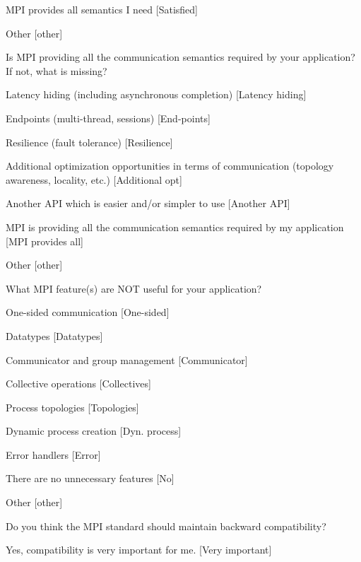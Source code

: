 \documentclass[conference,10pt,letterpaper]{IEEEtran}
\begin{document}
{{\begin{description}
\begin{inparaenum}[{\bf C}1)]
    \item MPI provides all semantics I need [Satisfied]
    \item Other [other]
    \end{inparaenum}
  \item[Q26*:] Is MPI providing all the communication semantics required
    by your application? If not, what is missing? 
    \begin{inparaenum}[{\bf C}1)]
    \item Latency hiding (including asynchronous completion) [Latency hiding]
    \item Endpoints (multi-thread, sessions) [End-points]
    \item Resilience (fault tolerance) [Resilience]
    \item Additional optimization opportunities in terms of communication
      (topology awareness, locality, etc.) [Additional opt]
    \item Another API which is easier and/or simpler to use [Another API]
    \item MPI is providing all the communication semantics required by my
      application [MPI provides all]
    \item Other [other]
    \end{inparaenum}
  \item[Q27*:] What MPI feature(s) are NOT useful for your application?
    \begin{inparaenum}[{\bf C}1)]
    \item One-sided communication [One-sided]
    \item Datatypes [Datatypes]
    \item Communicator and group management [Communicator]
    \item Collective operations [Collectives]
    \item Process topologies [Topologies]
    \item Dynamic process creation [Dyn. process]
    \item Error handlers [Error]
    \item There are no unnecessary features [No]
    \item Other [other]
    \end{inparaenum}
  \item[Q28:] Do you think the MPI standard should maintain backward
    compatibility? 
    \begin{inparaenum}[{\bf C}1)]
    \item Yes, compatibility is very important for me. [Very important]

\end{inparaenum}
\end{description}}}
\end{document}
